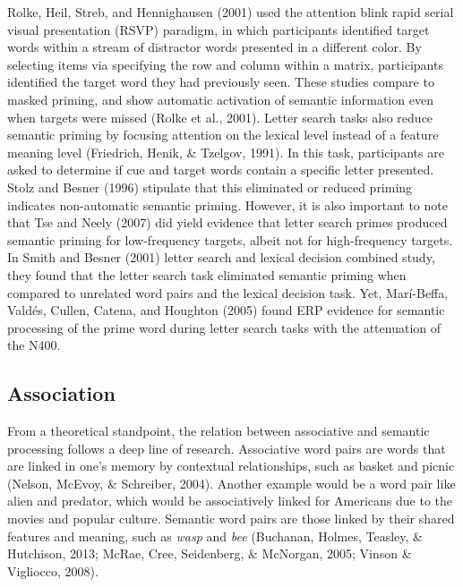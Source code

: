 \documentclass[english,man]{apa6}
\theoremstyle{definition}
\theoremstyle{definition}
\theoremstyle{definition}
\theoremstyle{remark}
\begin{document}
Rolke, Heil, Streb, and Hennighausen (2001) used the attention blink
rapid serial visual presentation (RSVP) paradigm, in which participants
identified target words within a stream of distractor words presented in
a different color. By selecting items via specifying the row and column
within a matrix, participants identified the target word they had
previously seen. These studies compare to masked priming, and show
automatic activation of semantic information even when targets were
missed (Rolke et al., 2001). Letter search tasks also reduce semantic
priming by focusing attention on the lexical level instead of a feature
meaning level (Friedrich, Henik, \& Tzelgov, 1991). In this task,
participants are asked to determine if cue and target words contain a
specific letter presented. Stolz and Besner (1996) stipulate that this
eliminated or reduced priming indicates non-automatic semantic priming.
However, it is also important to note that Tse and Neely (2007) did
yield evidence that letter search primes produced semantic priming for
low-frequency targets, albeit not for high-frequency targets. In Smith
and Besner (2001) letter search and lexical decision combined study,
they found that the letter search task eliminated semantic priming when
compared to unrelated word pairs and the lexical decision task. Yet,
Marí-Beffa, Valdés, Cullen, Catena, and Houghton (2005) found ERP
evidence for semantic processing of the prime word during letter search
tasks with the attenuation of the N400.

\subsection{Association}\label{association}

From a theoretical standpoint, the relation between associative and
semantic processing follows a deep line of research. Associative word
pairs are words that are linked in one's memory by contextual
relationships, such as basket and picnic (Nelson, McEvoy, \& Schreiber,
2004). Another example would be a word pair like alien and predator,
which would be associatively linked for Americans due to the movies and
popular culture. Semantic word pairs are those linked by their shared
features and meaning, such as \emph{wasp} and \emph{bee} (Buchanan,
Holmes, Teasley, \& Hutchison, 2013; McRae, Cree, Seidenberg, \&
McNorgan, 2005; Vinson \& Vigliocco, 2008).
\end{document}
